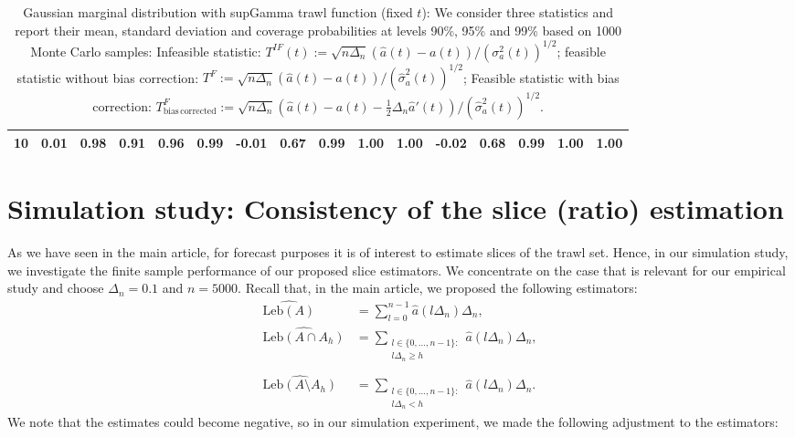 \documentclass{article}
\theoremstyle{plain}
\theoremstyle{definition}
\theoremstyle{remark}
\newcommand{\Leb}{\ensuremath{\mathrm{Leb}}}
\begin{document}
\begin{appendix}
{\begin{table}[ht]
\begin{tabular}{r|rrrrr|rrrrr|rrrrr}
  10 & 0.01 & 0.98 & 0.91 & 0.96 & 0.99 & -0.01 & 0.67 & 0.99 & 1.00 & 1.00 & -0.02 & 0.68 & 0.99 & 1.00 & 1.00 \\ 
   \bottomrule
\end{tabular}
\caption{ \label{tab:Gaussian-LM-fixedt} Gaussian marginal distribution with supGamma trawl function (fixed $t$): We consider three statistics and report their mean, standard deviation and coverage probabilities at levels 90\%, 95\% and 99\% based on 1000 Monte Carlo samples: Infeasible statistic: $T^{IF}(t):=\sqrt{n\Delta_{n}}\left(\hat{a}(t)-a(t)\right)/(\sigma_a^2(t))^{1/2}$; feasible statistic without bias correction: $T^{F}:=\sqrt{n\Delta_{n}}\left(\hat{a}(t)-a(t)\right)/(\hat \sigma_a^2(t))^{1/2}$; Feasible statistic with bias correction: $T^{F}_{\mathrm{bias \, corrected}}:=\sqrt{n\Delta_{n}}\left(\hat{a}(t)-a(t)-\frac{1}{2}\Delta_n \hat a'(t)\right)/(\hat \sigma_a^2(t))^{1/2}$.}
\end{table}
}

\FloatBarrier \clearpage
\section{Simulation study: Consistency of the slice (ratio) estimation}\label{asec:slices}
As we have seen in the main article, for forecast purposes it is of interest to estimate slices of the trawl set. Hence, in our simulation study, we investigate the finite sample performance of our proposed slice estimators. 
We concentrate on the case that is relevant for our empirical study and choose $\Delta_n=0.1$ and $n=5000$. 
Recall that, in the main article, we proposed the following estimators: 
\begin{align*}
	\widehat{\Leb(A)}&=	\sum_{l=0}^{n-1}\hat a(l\Delta_n)\Delta_n, 
	\\
	\widehat{	\Leb(A\cap A_h)} &=\sum_{\substack{l\in \{0, \ldots, n-1\}:\\ l\Delta_n \geq h}} \hat a(l\Delta_n)\Delta_n,\\
	\\
	\widehat{\Leb(A\setminus A_h)}&=\sum_{\substack{l\in \{0, \ldots, n-1\}:\\ l\Delta_n < h}} \hat a(l\Delta_n)\Delta_n.
	\end{align*}
We note that the estimates could become negative, so in our simulation experiment, we made the following adjustment to the estimators:


\end{appendix}
\end{document}
